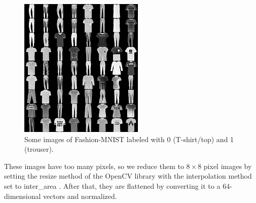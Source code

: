 \begin{figure}[htb]
    \centering
    \includegraphics[keepaspectratio, scale=0.5]{experiment/figure/fmnist.png}
    \caption{Some images of Fashion-MNIST labeled with 0 (T-shirt/top) and 1 (trouser).}
    \label{fig:fmnist}
\end{figure}

\par These images have too many pixels, so we reduce them to $8\times8$ pixel images by setting the resize method of the OpenCV library with the interpolation method set to inter\_area \cite{opencv_library}. After that, they are flattened by converting it to a $64$-dimensional vectors and normalized.